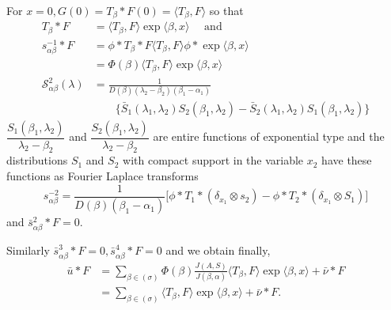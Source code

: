 For $x=0, G(0) = T_\beta * F (0) = \langle T_\beta, F \rangle$ so that 
\begin{align*}
  T_\beta * F & = \langle T_\beta, F \rangle \exp \langle\beta,x \rangle
  \quad \text { and }\\ 
  s^{-1}_{\alpha \beta} * F & = \phi * T_\beta * F \langle T_\beta, F
  \rangle \phi * \exp \langle \beta, x \rangle \\
  & =  \Phi (\beta) \langle T_\beta, F \rangle \exp \langle \beta, x \rangle\\
  \mathscr{S}^2_{\alpha \beta} (\lambda) & = \frac{1}{D(\beta)
    (\lambda_2 -\beta_2) (\beta_1 -\alpha_1)}\\ 
  & \qquad \bigg\{ \bar{S}_1
  (\lambda_1,\lambda_2) S_2 (\beta_1, \lambda_2) -\bar{S}_2
  (\lambda_1, \lambda_2) S_1 (\beta_1, \lambda_2)\bigg\} 
\end{align*}
$\dfrac{S_1 (\beta_1, \lambda_2)} {\lambda_2 -\beta_2}$ and
$\dfrac{S_2 (\beta_1, \lambda_2)} {\lambda_2- \beta_2}$ are entire
functions of exponential type and the distributions $S_1$ and $S_2$
with compact support in the variable $x_2$ have these functions as
Fourier Laplace transforms 
$$
s^{-2}_{\alpha \beta} = \frac{1}{D (\beta) (\beta_1- \alpha_1)} \bigg[
  \phi * T_1 * (\delta_{x_1} \otimes s_2) - \phi * T_2 * (\delta_{x_1}
  \otimes S_1)\bigg] 
$$
and $\bar{s}^2_{\alpha \beta} * F = 0$.

Similarly $\bar{s}^3_{\alpha \beta} * F = 0, \bar{s}^4_{\alpha \beta}
* F =0$ and we obtain finally, 
\begin{align*}
  \bar{u} * F  & = \sum_{ \beta \in (\sigma)} \Phi (\beta)
  \frac{ J (A,S)} {J (\beta, \alpha)} \langle T_\beta, F \rangle \exp
  \langle \beta,x \rangle +\bar{\nu} * F\\ 
  & = \sum_{ \beta \in (\sigma)} \langle T_\beta, F \rangle
  \exp \langle\beta,x \rangle +\bar{\nu} * F. 
\end{align*}

